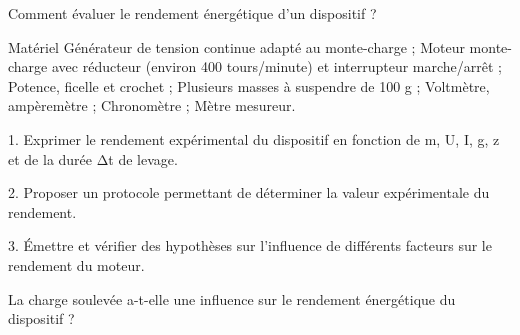 \documentclass[10pt]{article}
\begin{document}
\begin{center}

	Comment évaluer le rendement énergétique d’un dispositif ?

	Matériel
	Générateur de tension continue adapté au monte-charge ;
	Moteur monte-charge avec réducteur (environ 400 tours/minute) et interrupteur marche/arrêt ;
	Potence, ficelle et crochet ;
	Plusieurs masses à suspendre de 100 g ;
	Voltmètre, ampèremètre ;
	Chronomètre ;
	Mètre mesureur.

	1. Exprimer le rendement expérimental du dispositif en fonction de m, U, I, g, z et de la durée Δt de levage.


	2. Proposer un protocole permettant de déterminer la valeur expérimentale du rendement.


	3. Émettre et vérifier des hypothèses sur l’influence de différents facteurs sur le rendement du moteur.

	La charge soulevée a-t-elle une influence sur le rendement énergétique du dispositif ?
\end{center}


\begin{question}
\end{question}
\end{document}
